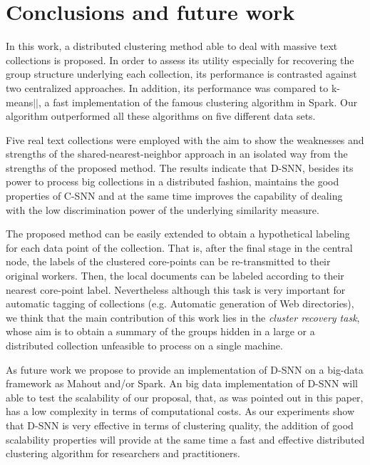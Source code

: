 \documentclass[smallextended]{svjour3}       %
\begin{document}
\section{Conclusions and future work}
\label{sec:conc}

In this work, a distributed clustering method able to deal with massive text collections is proposed. In order to assess its utility especially for recovering the group structure underlying each collection, its performance is contrasted against two centralized approaches.
In addition, its performance was compared to k-means$||$, a fast implementation of the famous clustering algorithm in Spark. Our algorithm outperformed all these algorithms on five different data sets.  

Five real text collections were employed with the aim to show the weaknesses and strengths of the shared-nearest-neighbor approach in an isolated way from the strengths of the proposed method. The results indicate that D-SNN, besides its power to process big collections in a distributed fashion, maintains the good properties of C-SNN and at the same time improves the capability of dealing with the low discrimination power of the underlying similarity measure. 

The proposed method can be easily extended to obtain a hypothetical labeling for each data point of the collection. That is, after the final stage in the central node, the labels of the clustered core-points can be re-transmitted to their original workers. Then, the local documents can be labeled according to their nearest core-point label.
Nevertheless although this task is very important for automatic tagging of collections (e.g. Automatic generation of Web directories), we think that the main contribution of this work lies in the \textit{cluster recovery task}, whose aim is to obtain a summary of the groups hidden in a large or a distributed collection unfeasible to process on a single machine. 

As future work we propose to provide an implementation of D-SNN on a big-data framework as Mahout and/or Spark. An big data implementation of D-SNN will able to test the scalability of our proposal, that, as was pointed out in this paper, has a low complexity in terms of computational costs. As our experiments show that D-SNN is very effective in terms of clustering quality, the addition of good scalability properties will provide at the same time a fast and effective distributed clustering algorithm for researchers and practitioners. 
\end{document}
